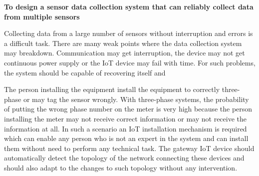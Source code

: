 \textbf{To design a sensor data collection system that can reliably collect data from multiple sensors}

Collecting data from a large number of sensors without interruption and errors is a difficult task. There are many weak points where the data collection system may breakdown. Communication may get interruption, the device may not get continuous power supply or the IoT device may fail with time. For such problems, the system should be capable of recovering itself and 

The person installing the equipment install the equipment to correctly three-phase or may tag the sensor wrongly. With three-phase systems, the probability of putting the wrong phase number on the meter is very high because the person installing the meter may not receive correct information or may not receive the information at all. In such a scenario an IoT installation mechanism is required which can enable any person who is not an expert in the system and can install them without need to perform any technical task. The gateway IoT device should automatically detect the topology of the network connecting these devices and should also adapt to the changes to such topology without any intervention.


